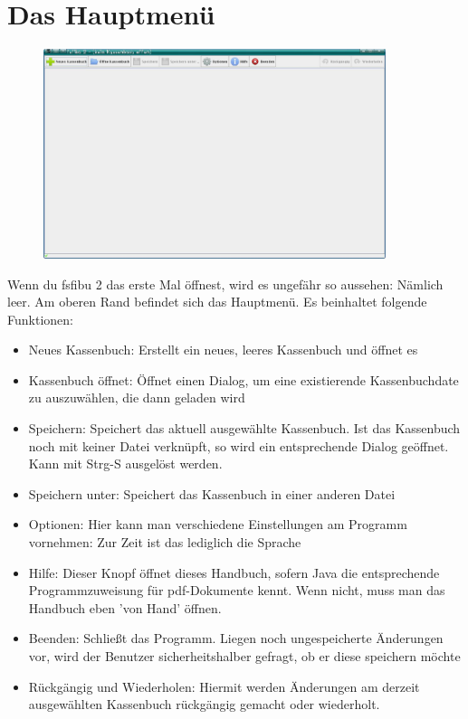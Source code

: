 \documentclass[a4paper,10pt,halfparskip,oneside,smallheadings]{scrbook}
\begin{document}
\section{Das Hauptmenü}
\begin{figure}[h]
	\includegraphics[width=10cm]{emptyprogram.jpg} 
\end{figure}
Wenn du fsfibu 2 das erste Mal öffnest, wird es ungefähr so aussehen: Nämlich leer. Am oberen Rand befindet sich das Hauptmenü. Es beinhaltet folgende Funktionen:
\begin{itemize}
 \item Neues Kassenbuch: Erstellt ein neues, leeres Kassenbuch und öffnet es
 \item Kassenbuch öffnet: Öffnet einen Dialog, um eine existierende Kassenbuchdate zu auszuwählen, die dann geladen wird
 \item Speichern: Speichert das aktuell ausgewählte Kassenbuch. Ist das Kassenbuch noch mit keiner Datei verknüpft, so wird ein entsprechende Dialog geöffnet. Kann mit Strg-S ausgelöst werden.
 \item Speichern unter: Speichert das Kassenbuch in einer anderen Datei
 \item Optionen: Hier kann man verschiedene Einstellungen am Programm vornehmen: Zur Zeit ist das lediglich die Sprache
 \item Hilfe: Dieser Knopf öffnet dieses Handbuch, sofern Java die entsprechende Programmzuweisung für pdf-Dokumente kennt. Wenn nicht, muss man das Handbuch eben 'von Hand' öffnen.
 \item Beenden: Schließt das Programm. Liegen noch ungespeicherte Änderungen vor, wird der Benutzer sicherheitshalber gefragt, ob er diese speichern möchte
 \item Rückgängig und Wiederholen: Hiermit werden Änderungen am derzeit ausgewählten Kassenbuch rückgängig gemacht oder wiederholt.
\end{itemize}
\end{document}

